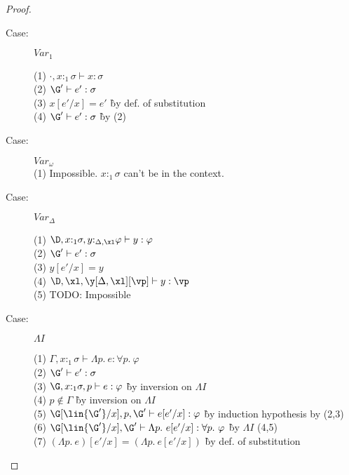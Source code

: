 \begin{proof}
\begin{description}
\item[Case:] $Var_1$
\begin{tabbing}
  (1) $\cdot,x{:}_1\sigma \vdash x : \sigma$\\
  (2) $\G' \vdash e' : \sigma$\\
  (3) $x[e'/x] = e'$ \` by def. of substitution\\
  (4) $\G' \vdash e' : \sigma$ \` by (2)\\
\end{tabbing}

\item[Case:] $Var_\omega$\\
  (1) Impossible. $x{:}_1\sigma$ can't be in the context.\\

\item[Case:] $Var_\Delta$
\begin{tabbing}
  (1) $\D, x{:}_1\sigma, y{:}_{\Delta,\xl}\varphi \vdash y : \varphi$\\
  (2) $\G' \vdash e' : \sigma$\\
  (3) $y[e'/x] = y$\\
  (4) $\D, \xl, \y[\Delta,\xl][\vp] \vdash y : \vp$\\
  (5) TODO: Impossible\\
\end{tabbing}

\item[Case:] $\Lambda I$
\begin{tabbing}
  (1) $\Gamma, x{:}_1\sigma \vdash \Lambda p.~e : \forall p.~\varphi$\\
  (2) $\G' \vdash e' : \sigma$\\
  (3) $\G, x{:}_1\sigma, p \vdash e : \varphi$ \` by inversion on $\Lambda I$\\
  (4) $p \notin \Gamma$ \` by inversion on $\Lambda I$\\
  (5) $\G[\lin{\G'}/x], p, \G' \vdash e[e'/x] : \varphi$ \` by induction hypothesis by (2,3)\\
  (6) $\G[\lin{\G'}/x], \G' \vdash \Lambda p.~e[e'/x] : \forall p.~\varphi$ \` by $\Lambda I$ (4,5)\\
  (7) $(\Lambda p.~e)[e'/x] = (\Lambda p.~e[e'/x])$ \` by def. of substitution\\
\end{tabbing}


\end{description}
\end{proof}
